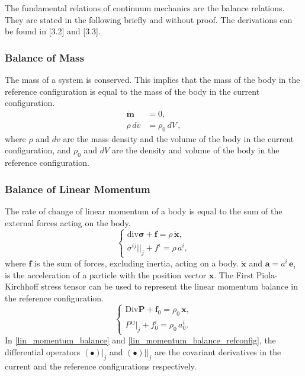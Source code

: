 \documentclass[../main.tex]{subfiles}
\begin{document}
The fundamental relations of continuum mechanics are the balance relations.
 They are stated in the following briefly and without proof. The derivations can be found in [3.2] and [3.3].
\subsubsection{Balance of Mass}
The mass of a system is conserved. This implies that the mass of the body in the reference configuration is equal to the 
 mass of the body in the current configuration.
\begin{align}\label{mass_balance}
    \boldsymbol{\dot{m}} &= 0,\\
    \rho \, dv &= \rho_{0} \, dV\,,
\end{align}
where $\rho$ and $dv$ are the mass density and the volume of the body in the current configuration, and 
 $\rho_{0}$ and $dV$ are the density and volume of the body in the reference configuration.
\subsubsection{Balance of Linear Momentum}
The rate of change of linear momentum of a body is equal to the sum of the external forces acting on the body.
\begin{equation}\label{lin_momentum_balance}
    \begin{cases}
        \mathrm{div} \boldsymbol{\sigma} + \boldsymbol{f} = \rho \, \boldsymbol{\ddot{x}},\\
        \sigma ^{ij}||_{j} + f^{i} = \rho \, a^{i},
    \end{cases}  
\end{equation}
where $\boldsymbol{f}$ is the sum of forces, excluding inertia, acting on a body. $\boldsymbol{\ddot{x}}$ and $\boldsymbol{a} = a^{i} \, \boldsymbol{e}_{i}$
 is the acceleration of a particle with the position vector $\boldsymbol{x}$.
The First Piola-Kirchhoff stress tensor can be used to represent the linear momentum balance in the reference configuration.
\begin{equation}\label{lin_momentum_balance_refconfig}
    \begin{cases}
        \mathrm{Div} \boldsymbol{{P}} + \boldsymbol{f}_{0} = \rho_{0} \, \boldsymbol{\ddot{x}},\\
        P^{ij}|_{j} + f_{0}^{i} = \rho_{0} \, a_{0}^{i}.\
    \end{cases}
\end{equation} 
In \eqref{lin_momentum_balance} and \eqref{lin_momentum_balance_refconfig}, the differential operators $(\bullet)|_{j}$
 and $(\bullet)||_{j}$ are the covariant derivatives in the current and the reference configurations respectively.
\end{document}
